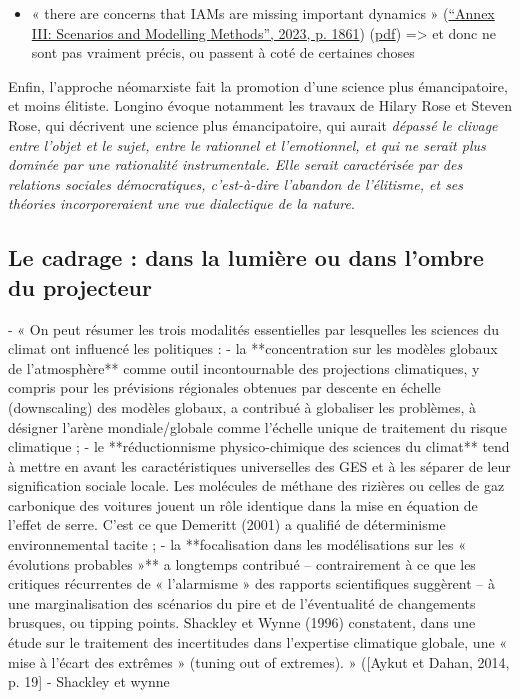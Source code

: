 \begin{itemize}
    \item « there are concerns that IAMs are missing important dynamics » (\href{zotero://select/library/items/2SDDNUUF}{“Annex III: Scenarios and Modelling Methods”, 2023, p. 1861}) (\href{zotero://open-pdf/library/items/CHVFSLLH?page=21&annotation=WDMBNU3A}{pdf})
=> et donc ne sont pas vraiment précis, ou passent à coté de certaines choses

\end{itemize}


Enfin, l'approche néomarxiste fait la promotion d'une science plus émancipatoire, et moins élitiste. Longino évoque notamment les travaux de Hilary Rose et Steven Rose, qui décrivent une science plus émancipatoire, qui aurait \emph{dépassé le clivage entre l'objet et le sujet, entre le rationnel et l'emotionnel, et qui ne serait plus dominée par une rationalité instrumentale. Elle serait caractérisée par des relations sociales démocratiques, c'est-à-dire l'abandon de l'élitisme, et ses théories incorporeraient une vue dialectique de la nature}.


\subsection{Le cadrage : dans la lumière ou dans l'ombre du projecteur}

- « On peut résumer les trois modalités essentielles par lesquelles les sciences du climat ont influencé les politiques :  
	- la **concentration sur les modèles globaux de l’atmosphère** comme outil incontournable des projections climatiques, y compris pour les prévisions régionales obtenues par descente en échelle (downscaling) des modèles globaux, a contribué à globaliser les problèmes, à désigner l’arène mondiale/globale comme l’échelle unique de traitement du risque climatique ;
	- le **réductionnisme physico-chimique des sciences du climat** tend à mettre en avant les caractéristiques universelles des GES et à les séparer de leur signification sociale locale. Les molécules de méthane des rizières ou celles de gaz carbonique des voitures jouent un rôle identique dans la mise en équation de l’effet de serre. C’est ce que Demeritt (2001) a qualifié de déterminisme environnemental tacite ;
	- la **focalisation dans les modélisations sur les « évolutions probables »** a longtemps contribué – contrairement à ce que les critiques récurrentes de « l’alarmisme » des rapports scientifiques suggèrent – à une marginalisation des scénarios du pire et de l’éventualité de changements brusques, ou tipping points. Shackley et Wynne (1996) constatent, dans une étude sur le traitement des incertitudes dans l’expertise climatique globale, une « mise à l’écart des extrêmes » (tuning out of extremes). » ([Aykut et Dahan, 2014, p. 19]
		- Shackley et wynne

